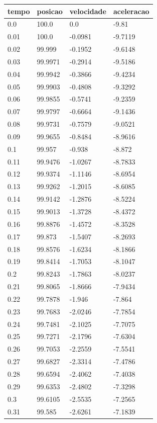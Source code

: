 \begin{tabular}{llll}
\toprule
tempo & posicao & velocidade & aceleracao \\
\midrule
0.0 & 100.0 & 0.0 & -9.81 \\
0.01 & 100.0 & -0.0981 & -9.7119 \\
0.02 & 99.999 & -0.1952 & -9.6148 \\
0.03 & 99.9971 & -0.2914 & -9.5186 \\
0.04 & 99.9942 & -0.3866 & -9.4234 \\
0.05 & 99.9903 & -0.4808 & -9.3292 \\
0.06 & 99.9855 & -0.5741 & -9.2359 \\
0.07 & 99.9797 & -0.6664 & -9.1436 \\
0.08 & 99.9731 & -0.7579 & -9.0521 \\
0.09 & 99.9655 & -0.8484 & -8.9616 \\
0.1 & 99.957 & -0.938 & -8.872 \\
0.11 & 99.9476 & -1.0267 & -8.7833 \\
0.12 & 99.9374 & -1.1146 & -8.6954 \\
0.13 & 99.9262 & -1.2015 & -8.6085 \\
0.14 & 99.9142 & -1.2876 & -8.5224 \\
0.15 & 99.9013 & -1.3728 & -8.4372 \\
0.16 & 99.8876 & -1.4572 & -8.3528 \\
0.17 & 99.873 & -1.5407 & -8.2693 \\
0.18 & 99.8576 & -1.6234 & -8.1866 \\
0.19 & 99.8414 & -1.7053 & -8.1047 \\
0.2 & 99.8243 & -1.7863 & -8.0237 \\
0.21 & 99.8065 & -1.8666 & -7.9434 \\
0.22 & 99.7878 & -1.946 & -7.864 \\
0.23 & 99.7683 & -2.0246 & -7.7854 \\
0.24 & 99.7481 & -2.1025 & -7.7075 \\
0.25 & 99.7271 & -2.1796 & -7.6304 \\
0.26 & 99.7053 & -2.2559 & -7.5541 \\
0.27 & 99.6827 & -2.3314 & -7.4786 \\
0.28 & 99.6594 & -2.4062 & -7.4038 \\
0.29 & 99.6353 & -2.4802 & -7.3298 \\
0.3 & 99.6105 & -2.5535 & -7.2565 \\
0.31 & 99.585 & -2.6261 & -7.1839 \\

\end{tabular}
